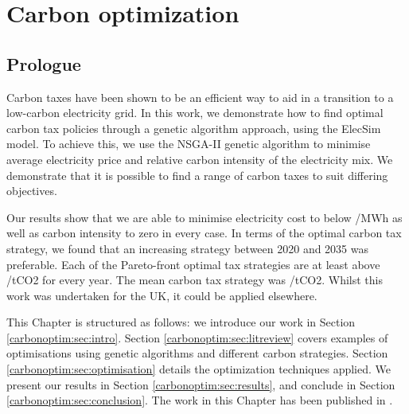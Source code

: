 \chapter{Carbon optimization}
\label{chapter:carbon}
\ifpdf
\graphicspath{{Chapter3/Figs/Raster/}{Chapter3/Figs/PDF/}{Chapter3/Figs/}}
\else
\graphicspath{{Chapter3/Figs/Vector/}{Chapter3/Figs/}}
\fi



\section*{Prologue}


Carbon taxes have been shown to be an efficient way to aid in a transition to a low-carbon electricity grid. In this work, we demonstrate how to find optimal carbon tax policies through a genetic algorithm approach, using the ElecSim model. To achieve this, we use the NSGA-II genetic algorithm \cite{Valkanas2014} to minimise average electricity price and relative carbon intensity of the electricity mix. We demonstrate that it is possible to find a range of carbon taxes to suit differing objectives. 

Our results show that we are able to minimise electricity cost to below /MWh as well as carbon intensity to zero in every case. In terms of the optimal carbon tax strategy, we found that an increasing strategy between 2020 and 2035 was preferable. Each of the Pareto-front optimal tax strategies are at least above /tCO2 for every year. The mean carbon tax strategy was /tCO2. Whilst this work was undertaken for the UK, it could be applied elsewhere.

This Chapter is structured as follows: we introduce our work in Section \ref{carbonoptim:sec:intro}. Section \ref{carbonoptim:sec:litreview} covers examples of optimisations using genetic algorithms and different carbon strategies. Section \ref{carbonoptim:sec:optimisation} details the optimization techniques applied. We present our results in Section \ref{carbonoptim:sec:results}, and conclude in Section \ref{carbonoptim:sec:conclusion}. The work in this Chapter has been published in \cite{Kell2020a}.


